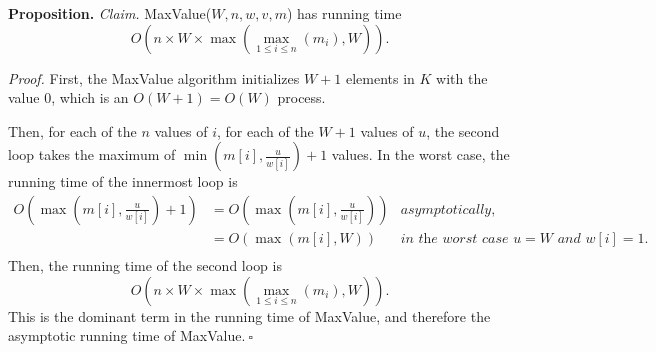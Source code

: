 \begin{enumerate}
\begin{solution}
\textbf{Proposition. }\textit{Claim. }{\sc MaxValue}($W,n,w,v,m$) has running time \[O\left(n\times W\times\max\left(\underset{1\leq i\leq n}{\max}(m_i),W\right)\right).\]

\textit{Proof. }First, the {\sc MaxValue} algorithm initializes $W+1$ elements in $K$ with the value $0$, which is an $O(W+1)=O(W)$ process.

Then, for each of the $n$ values of $i$, for each of the $W+1$ values of $u$, the second loop takes the maximum of $\min\left(m[i],\frac{u}{w[i]}\right)+1$ values. In the worst case, the running time of the innermost loop is
\begin{align*}
O\left(\max\left(m[i],\frac{u}{w[i]}\right)+1\right)
&=O\left(\max\left(m[i],\frac{u}{w[i]}\right)\right)&\textit{asymptotically,}\\
&=O(\max(m[i],W))&\textit{in the worst case $u=W$ and $w[i]=1$.}\\
\end{align*}
Then, the running time of the second loop is \[O\left(n\times W\times\max\left(\underset{1\leq i\leq n}{\max}(m_i),W\right)\right).\]
This is the dominant term in the running time of {\sc MaxValue}, and therefore the asymptotic running time of {\sc MaxValue}.$~\square$
\end{solution}
\end{enumerate}
\newpage
